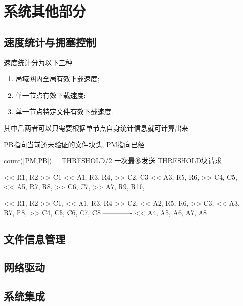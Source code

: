 \chapter{系统其他部分}
\section{速度统计与拥塞控制}
速度统计分为以下三种
\begin{enumerate}
	\item 局域网内全局有效下载速度;
	\item 单一节点有效下载速度;
	\item 单一节点特定文件有效下载速度.
\end{enumerate}

其中后两者可以只需要根据单节点自身统计信息就可计算出来

PB指向当前还未验证的文件块头, PM指向已经

count([PM,PB]) = THRESHOLD/2
一次最多发送 THRESHOLD块请求

<< R1, R2
>> C1
<< A1, R3, R4, %
>> C2, C3
<< A3, R5, R6,
>> C4, C5,
<< A5, R7, R8,
>> C6, C7,
>> A7, R9, R10,

<< R1, R2
>> C1,
<< A1, R3, R4
>> C2,
<< A2, R5, R6,
>> C3,
<< A3, R7, R8,
>> C4, C5, C6, C7, C8
-------------
<< A4, A5, A6, A7, A8




\section{文件信息管理}
\section{网络驱动}
\section{系统集成}
